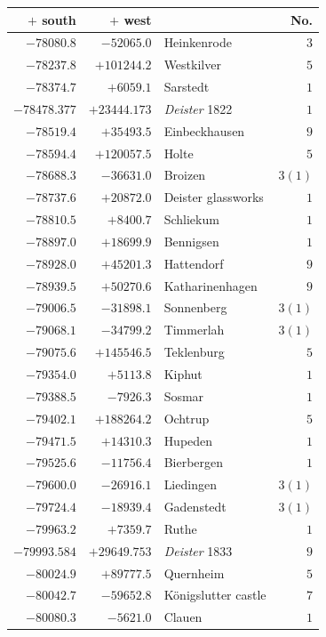 \begin{center}\begingroup\fontsize{8}{9}\selectfont
\setlength{\tabcolsep}{4pt}
\begin{tabular}{r|r|p{170pt}|r}\hline
\(+\) south&\(+\) west&&No.\\\hline
\(-78080.8\)&\(-52065.0\)&Heinkenrode&\(3\)\\
\(-78237.8\)&\(+101244.2\)&Westkilver&\(5\)\\
\(-78374.7\)&\(+6059.1\)&Sarstedt&\(1\)\\
\(-78478.377\)&\(+23444.173\)&\textit{Deister} 1822&\(1\)\\
\(-78519.4\)&\(+35493.5\)&Einbeckhausen&\(9\)\\
\(-78594.4\)&\(+120057.5\)&Holte&\(5\)\\
\(-78688.3\)&\(-36631.0\)&Broizen&\(3 (1)\)\\
\(-78737.6\)&\(+20872.0\)&Deister glassworks&\(1\)\\
\(-78810.5\)&\(+8400.7\)&Schliekum&\(1\)\\
\(-78897.0\)&\(+18699.9\)&Bennigsen&\(1\)\\
\(-78928.0\)&\(+45201.3\)&Hattendorf&\(9\)\\
\(-78939.5\)&\(+50270.6\)&Katharinenhagen&\(9\)\\
\(-79006.5\)&\(-31898.1\)&Sonnenberg&\(3 (1)\)\\
\(-79068.1\)&\(-34799.2\)&Timmerlah&\(3 (1)\)\\
\(-79075.6\)&\(+145546.5\)&Teklenburg&\(5\)\\
\(-79354.0\)&\(+5113.8\)&Kiphut&\(1\)\\
\(-79388.5\)&\(-7926.3\)&Sosmar&\(1\)\\
\(-79402.1\)&\(+188264.2\)&Ochtrup&\(5\)\\
\(-79471.5\)&\(+14310.3\)&Hupeden&\(1\)\\
\(-79525.6\)&\(-11756.4\)&Bierbergen&\(1\)\\
\(-79600.0\)&\(-26916.1\)&Liedingen&\(3 (1)\)\\
\(-79724.4\)&\(-18939.4\)&Gadenstedt&\(3 (1)\)\\
\(-79963.2\)&\(+7359.7\)&Ruthe&\(1\)\\
\(-79993.584\)&\(+29649.753\)&\textit{Deister} 1833&\(9\)\\
\(-80024.9\)&\(+89777.5\)&Quernheim&\(5\)\\
\(-80042.7\)&\(-59652.8\)&Königslutter castle&\(7\)\\
\(-80080.3\)&\(-5621.0\)&Clauen&\(1\)\\

\end{tabular}
\end{center}
